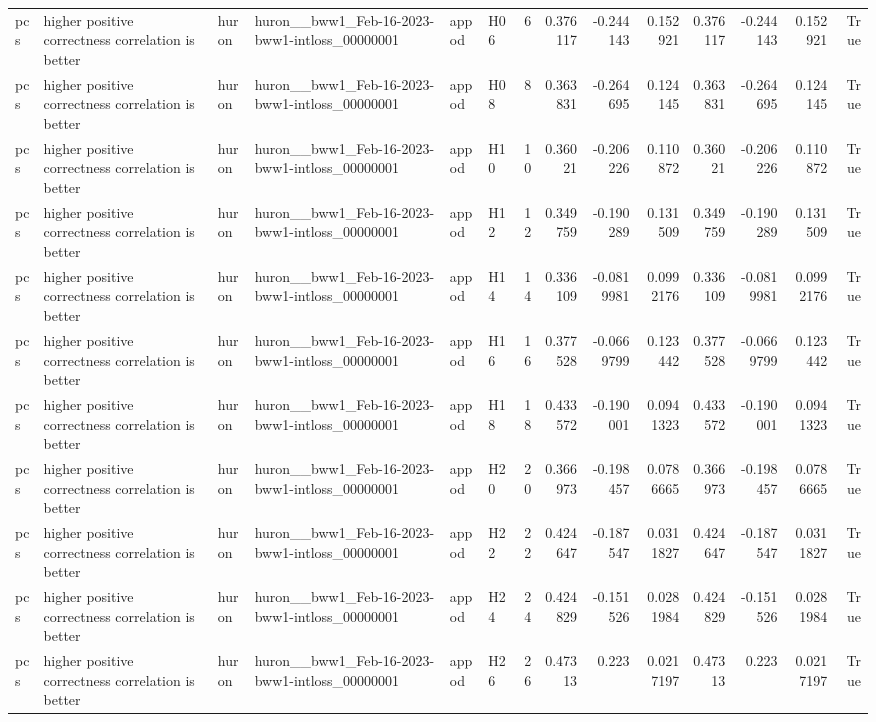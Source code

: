 \begin{longtable}{llllllrrrrrrrr}
pcs & higher positive correctness correlation is better & huron & huron\_\_bww1\_Feb-16-2023-bww1-intloss\_00000001 & appod & H06 & 6 & 0.376117 & -0.244143 & 0.152921 & 0.376117 & -0.244143 & 0.152921 & True \\
pcs & higher positive correctness correlation is better & huron & huron\_\_bww1\_Feb-16-2023-bww1-intloss\_00000001 & appod & H08 & 8 & 0.363831 & -0.264695 & 0.124145 & 0.363831 & -0.264695 & 0.124145 & True \\
pcs & higher positive correctness correlation is better & huron & huron\_\_bww1\_Feb-16-2023-bww1-intloss\_00000001 & appod & H10 & 10 & 0.36021 & -0.206226 & 0.110872 & 0.36021 & -0.206226 & 0.110872 & True \\
pcs & higher positive correctness correlation is better & huron & huron\_\_bww1\_Feb-16-2023-bww1-intloss\_00000001 & appod & H12 & 12 & 0.349759 & -0.190289 & 0.131509 & 0.349759 & -0.190289 & 0.131509 & True \\
pcs & higher positive correctness correlation is better & huron & huron\_\_bww1\_Feb-16-2023-bww1-intloss\_00000001 & appod & H14 & 14 & 0.336109 & -0.0819981 & 0.0992176 & 0.336109 & -0.0819981 & 0.0992176 & True \\
pcs & higher positive correctness correlation is better & huron & huron\_\_bww1\_Feb-16-2023-bww1-intloss\_00000001 & appod & H16 & 16 & 0.377528 & -0.0669799 & 0.123442 & 0.377528 & -0.0669799 & 0.123442 & True \\
pcs & higher positive correctness correlation is better & huron & huron\_\_bww1\_Feb-16-2023-bww1-intloss\_00000001 & appod & H18 & 18 & 0.433572 & -0.190001 & 0.0941323 & 0.433572 & -0.190001 & 0.0941323 & True \\
pcs & higher positive correctness correlation is better & huron & huron\_\_bww1\_Feb-16-2023-bww1-intloss\_00000001 & appod & H20 & 20 & 0.366973 & -0.198457 & 0.0786665 & 0.366973 & -0.198457 & 0.0786665 & True \\
pcs & higher positive correctness correlation is better & huron & huron\_\_bww1\_Feb-16-2023-bww1-intloss\_00000001 & appod & H22 & 22 & 0.424647 & -0.187547 & 0.0311827 & 0.424647 & -0.187547 & 0.0311827 & True \\
pcs & higher positive correctness correlation is better & huron & huron\_\_bww1\_Feb-16-2023-bww1-intloss\_00000001 & appod & H24 & 24 & 0.424829 & -0.151526 & 0.0281984 & 0.424829 & -0.151526 & 0.0281984 & True \\
pcs & higher positive correctness correlation is better & huron & huron\_\_bww1\_Feb-16-2023-bww1-intloss\_00000001 & appod & H26 & 26 & 0.47313 & 0.223 & 0.0217197 & 0.47313 & 0.223 & 0.0217197 & True \\

\end{longtable}
